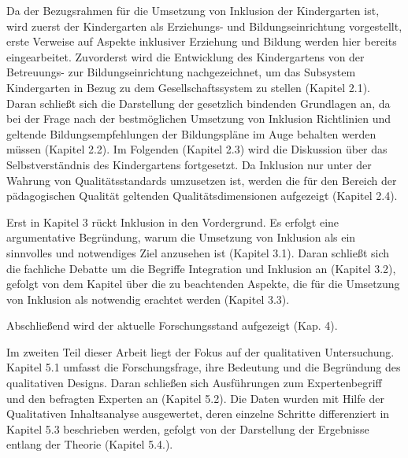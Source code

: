 Da der Bezugsrahmen für die Umsetzung von Inklusion der Kindergarten ist, wird zuerst der Kindergarten als Erziehungs- und Bildungseinrichtung vorgestellt, erste Verweise auf Aspekte inklusiver Erziehung und Bildung werden hier bereits eingearbeitet.  
Zuvorderst wird die Entwicklung des Kindergartens von der Betreuungs- zur Bildungseinrichtung nachgezeichnet, um das Subsystem Kindergarten in Bezug zu dem Gesellschaftssystem zu stellen (Kapitel 2.1). Daran schließt sich die Darstellung der gesetzlich bindenden Grundlagen an, da bei der Frage nach der bestmöglichen Umsetzung von Inklusion  Richtlinien und geltende Bildungsempfehlungen der Bildungspläne im Auge behalten werden müssen (Kapitel 2.2).    
Im Folgenden (Kapitel 2.3) wird die Diskussion über das Selbstverständnis des Kindergartens fortgesetzt.
Da Inklusion nur unter der Wahrung von Qualitätsstandards umzusetzen ist, werden die für den Bereich der pädagogischen Qualität geltenden Qualitätsdimensionen aufgezeigt (Kapitel 2.4).

Erst in Kapitel 3 rückt Inklusion in den Vordergrund. Es erfolgt eine argumentative Begründung, warum die Umsetzung von Inklusion als ein sinnvolles und notwendiges Ziel anzusehen ist (Kapitel 3.1). Daran schließt sich die fachliche Debatte um die Begriffe Integration und Inklusion an (Kapitel 3.2), gefolgt von dem Kapitel über die zu beachtenden Aspekte, die für die Umsetzung von Inklusion als notwendig erachtet werden (Kapitel 3.3).
 
Abschließend wird der aktuelle Forschungsstand aufgezeigt (Kap. 4).
   
Im zweiten Teil dieser Arbeit liegt der Fokus auf der qualitativen Untersuchung. 
Kapitel 5.1 umfasst die Forschungsfrage, ihre Bedeutung und die Begründung des qualitativen Designs. Daran schließen sich Ausführungen zum  Expertenbegriff und den befragten Experten an (Kapitel 5.2). Die Daten wurden mit Hilfe der Qualitativen Inhaltsanalyse ausgewertet, deren einzelne Schritte differenziert in Kapitel 5.3 beschrieben werden, gefolgt von der Darstellung der Ergebnisse entlang der Theorie (Kapitel 5.4.).

